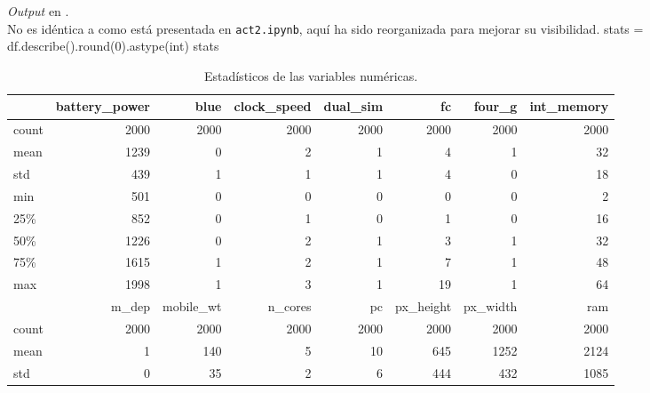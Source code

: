 \documentclass[12pt,twocolumn,a4paper]{apa_article}
\begin{document}
\setcounter{ipythcntr}{4}
\begin{ipynbincommented}[label={cod:describe}]{
  \textit{Output} en .\\
  No es idéntica a como está presentada en \texttt{act2.ipynb}, aquí ha sido reorganizada para mejorar su visibilidad.
}
stats = df.describe().round(0).astype(int)
stats
\end{ipynbincommented}

\begin{table*}
	\scriptsize\centering
	\begin{threeparttable}
		\caption{Estadísticos de las variables numéricas.}
		\label{tab:estadisticos}
		\begin{tabular}{lrrrrrrr}
      \toprule
      {} &  battery\_power &  blue &  clock\_speed &  dual\_sim &    fc &  four\_g &  int\_memory \\
      \midrule
      count &           2000 &  2000 &         2000 &      2000 &  2000 &    2000 &        2000 \\
      mean  &           1239 &     0 &            2 &         1 &     4 &       1 &          32 \\
      std   &            439 &     1 &            1 &         1 &     4 &       0 &          18 \\
      min   &            501 &     0 &            0 &         0 &     0 &       0 &           2 \\
      25\%   &            852 &     0 &            1 &         0 &     1 &       0 &          16 \\
      50\%   &           1226 &     0 &            2 &         1 &     3 &       1 &          32 \\
      75\%   &           1615 &     1 &            2 &         1 &     7 &       1 &          48 \\
      max   &           1998 &     1 &            3 &         1 &    19 &       1 &          64 \\
      \bottomrule
      \toprule
      {} &  m\_dep &  mobile\_wt &  n\_cores &    pc &  px\_height &  px\_width &   ram \\
      \midrule
      count &   2000 &       2000 &     2000 &  2000 &       2000 &      2000 &  2000 \\
      mean  &      1 &        140 &        5 &    10 &        645 &      1252 &  2124 \\
      std   &      0 &         35 &        2 &     6 &        444 &       432 &  1085 \\

\end{tabular}
\end{threeparttable}
\end{table*}
\end{document}
